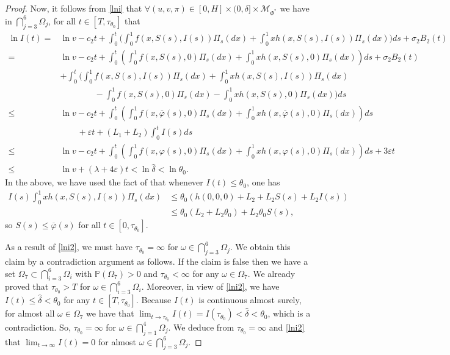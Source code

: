 \documentclass[12pt]{amsart}
\theoremstyle{remark}
\numberwithin{equation}{section}
\newcommand{\eps}{\varepsilon}
\newcommand{\M}{\mathcal{M}}
\newcommand{\PP}{\mathbb{P}}
\numberwithin{equation}{section}
\newcommand{\wdt}{\widetilde}
\newcommand{\1}{\boldsymbol{1}}
\def\bar{\overline}
\def\hat{\widehat}
\begin{document}
\begin{proof}
Now, it follows from \eqref{lni} that $\forall (u,v,\pi) \in [0,H]\times (0,\delta]\times\M_{\Phi^*}$  we have in $\bigcap_{j=3}^{6}\Omega_j$, for all $t\in [T,\tau_{\theta_0}]$ that
\begin{equation}\label{lni2}
\begin{aligned}
\ln I(t)
=&\ln v -c_2t +  \!\!\int_0^{t}\!\Big(\!\int_0^1\! f(x,S(s),I(s))\Pi_s(dx) + \!\! \int_0^1\! xh(x,S(s),I(s))\Pi_s(dx)\!\Big)ds+\sigma_2B_2(t)\\
=&\ln v -c_2t +\int_0^{t}\left(\int_0^1 f(x,S(s),0)\Pi_s(dx) + \int_0^1xh(x,S(s),0)\Pi_s(dx)\right)ds+\sigma_2B_2(t)
\\&+ \int_0^{t}\bigg (\int_0^1f(x,S(s),I(s))\Pi_s(dx) + \int_0^1xh(x,S(s),I(s))\Pi_s(dx)
\\
&\qquad\qquad-\int_0^1f(x,S(s),0)\Pi_s(dx) - \int_0^1xh(x,S(s),0)\Pi_s(dx)\bigg)ds\\
\leq&\ln v -c_2t +  \int_0^{t}\left( \int_0^1f(x,\bar \varphi(s),0)\Pi_s(dx) + \int_0^1xh(x,\bar \varphi(s),0)\Pi_s(dx)\right)ds\\
&\qquad +\eps t+(L_1+L_2)\int_0^t I(s)ds\\
\leq&\ln v -c_2t +  \int_0^{t}\left( \int_0^1f(x,\varphi(s),0)\Pi_s(dx) + \int_0^1xh(x,\varphi(s),0)\Pi_s(dx)\right)ds+3\eps t\\
\leq&\ln v +(\lambda+4\eps)t
<\ln\hat\delta<\ln\theta_0.
\end{aligned}
\end{equation}
In the above, we have used the fact of that whenever $I(t)\leq \theta_0$, one has
$$
\begin{aligned}
I(s)\int_0^1xh(x,S(s),I(s))\Pi_s(dx)&\leq \theta_0(h(0,0,0)+L_2+L_2S(s)+L_2I(s))\\
&\leq \theta_0(L_2+L_2\theta_0)+L_2\theta_0S(s),
\end{aligned}
$$
so $S(s)\leq\bar\varphi(s)$ for all $t\in [0,\tau_{\theta_0}]$.

As a result of \eqref{lni2}, we must have $\tau_{\theta_0}=\infty$ for $\omega\in\bigcap_{j=3}^6\Omega_j$.
We obtain this claim by a contradiction argument as follows. If the claim is false then we have a set $\Omega_7\subset\bigcap_{i=3}^6\Omega_i$
with $\PP(\Omega_7) > 0$ and $\tau_{\theta_0} <\infty$ for any $\omega\in\Omega_7$. We already proved that $\tau_{\theta_0}>T$ for
$\omega\in\bigcap_{i=3}^6\Omega_i$. Moreover, in view of \eqref{lni2}, we have $I(t) \leq \hat\delta<\theta_0$ for any $t\in[T,\tau_{\theta_0}]$. Because
$I(t)$ is continuous almost surely, for almost all $\omega\in\Omega_7$ we have that $\lim_{t\to\tau_{\theta_0}}I(t) = I(\tau_{\theta_0}) <\hat\delta<\theta_0$,
which is a contradiction. So, $\tau_{\theta_0}=\infty$ for $\omega\in\bigcap_{j=1}^4\Omega_j$.
We deduce from $\tau_{\theta_0}=\infty$ and \eqref{lni2} that
$\lim_{t\to\infty} I(t)=0$ for almost $\omega\in\bigcap_{j=3}^6\Omega_j$.


\end{proof}
\end{document}
